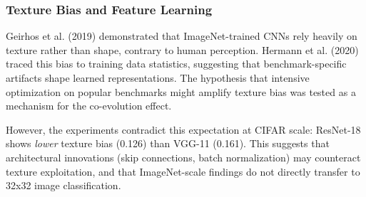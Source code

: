 \subsubsection{Texture Bias and Feature Learning}

Geirhos et al. (2019) demonstrated that ImageNet-trained CNNs rely heavily on texture rather than shape, contrary to human perception. Hermann et al. (2020) traced this bias to training data statistics, suggesting that benchmark-specific artifacts shape learned representations. The hypothesis that intensive optimization on popular benchmarks might amplify texture bias was tested as a mechanism for the co-evolution effect.

However, the experiments contradict this expectation at CIFAR scale: ResNet-18 shows \textit{lower} texture bias (0.126) than VGG-11 (0.161). This suggests that architectural innovations (skip connections, batch normalization) may counteract texture exploitation, and that ImageNet-scale findings do not directly transfer to 32x32 image classification.

